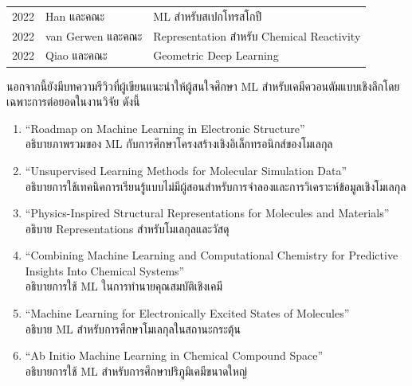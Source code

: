 \begin{table}[H]
\begin{tabular}{cll}
        2022                  & Han และคณะ\autocite{han2022}                                      & ML สำหรับสเปกโทรสโกปี                      \\
        2022                  & van Gerwen และคณะ\autocite{gerwen2022}                            & Representation สำหรับ Chemical Reactivity \\
        2022                  & Qiao และคณะ\autocite{qiao2022}                                    & Geometric Deep Learning                 \\
        \bottomrule
    \end{tabular}
\end{table}

นอกจากนี้ยังมีบทความรีวิวที่ผู้เขียนแนะนำให้ผู้สนใจศึกษา ML สำหรับเคมีควอนตัมแบบเชิงลึกโดยเฉพาะการต่อยอดในงานวิจัย ดังนี้
%
\begin{enumerate}[topsep=0pt,noitemsep]\setlength\itemsep{0.5em}
    \item \enquote{Roadmap on Machine Learning in Electronic Structure}\autocite{kulik2022} \\
    อธิบายภาพรวมของ ML กับการศึกษาโครงสร้างเชิงอิเล็กทรอนิกส์ของโมเลกุล

    \item \enquote{Unsupervised Learning Methods for Molecular Simulation Data}\autocite{glielmo2021} \\
    อธิบายการใช้เทคนิคการเรียนรู้แบบไม่มีผู้สอนสำหรับการจำลองและการวิเคราะห์ข้อมูลเชิงโมเลกุล

    \item \enquote{Physics-Inspired Structural Representations for Molecules and Materials}\autocite{musil2021} \\
    อธิบาย Representations สำหรับโมเลกุลและวัสดุ

    \item \enquote{Combining Machine Learning and Computational Chemistry for Predictive Insights Into Chemical Systems}\autocite{keith2021} \\
    อธิบายการใช้ ML ในการทำนายคุณสมบัติเชิงเคมี

    \item \enquote{Machine Learning for Electronically Excited States of Molecules}\autocite{westermayr2021a} \\
    อธิบาย ML สำหรับการศึกษาโมเลกุลในสถานะกระตุ้น

    \item \enquote{Ab Initio Machine Learning in Chemical Compound Space}\autocite{huang2021} \\
    อธิบายการใช้ ML สำหรับการศึกษาปริภูมิเคมีขนาดใหญ่


\end{enumerate}
